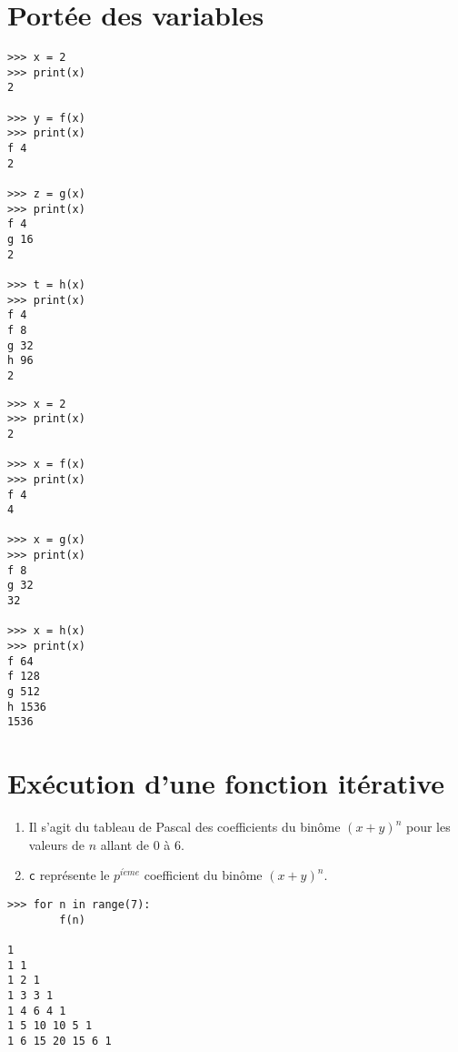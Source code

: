 \documentclass[11pt,a4paper]{article}
\begin{document}
\section{Portée des variables}
%

\begin{minipage}[t]{7cm}\footnotesize
\begin{verbatim}
>>> x = 2
>>> print(x)
2

>>> y = f(x)
>>> print(x)
f 4
2

>>> z = g(x)
>>> print(x)
f 4
g 16
2

>>> t = h(x)
>>> print(x)
f 4
f 8
g 32
h 96
2
\end{verbatim}
\end{minipage}
\hfill
\begin{minipage}[t]{7cm}\footnotesize
\begin{verbatim}
>>> x = 2
>>> print(x)
2

>>> x = f(x)
>>> print(x)
f 4
4

>>> x = g(x)
>>> print(x)
f 8
g 32
32

>>> x = h(x)
>>> print(x)
f 64
f 128
g 512
h 1536
1536
\end{verbatim}
\end{minipage}

\section{Exécution d'une fonction itérative}
%

\begin{minipage}[t]{10cm}
\begin{enumerate}
\item Il s'agit du tableau de Pascal des coefficients du binôme $(x+y)^n$
	pour les valeurs de $n$ allant de 0 à 6.
\item {\tt c} représente le $p^{i\grave eme}$ coefficient du binôme $(x+y)^n$.
\end{enumerate}
\end{minipage}
\hfill
\begin{minipage}[t]{4cm}
\begin{verbatim}
>>> for n in range(7): 
        f(n)

1 
1 1 
1 2 1 
1 3 3 1 
1 4 6 4 1 
1 5 10 10 5 1 
1 6 15 20 15 6 1 
\end{verbatim}
\end{minipage}


\label{fini}
\end{document}
